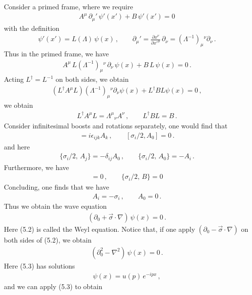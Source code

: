 \documentclass[11pt, onesided]{book}
\theoremstyle{break}
\theoremstyle{break}
\newcommand{\pd}{\partial}
\begin{document}
Consider a primed frame, where we require
\begin{align*}
A^\mu\, \pd_\mu' \, \psi'(x') + B\, \psi'(x') = 0
\end{align*}
with the definition
\begin{align*}
\psi'(x') = L(\Lambda)\, \psi(x)\,, \qquad
\pd_\mu' = \frac{\pd x^\nu}{\pd x'^\mu}\,\pd_\nu = (\Lambda^{-1})_\mu{}^{\nu}\pd_\nu\,.
\end{align*}
Thus in the primed frame, we have
\begin{align*}
A^\mu \, L(\Lambda^{-1})_\mu{}^{\nu}\,\pd_\nu \, \psi(x) + B \, L\,\psi(x) = 0\,.
\end{align*}
Acting $L^\dagger = L^{-1}$ on both sides, we obtain
\begin{align*}
(L^\dagger A^\mu L ) ( \Lambda^{-1})_{\mu}{}^\nu\pd_\nu \psi(x) + L^\dagger BL\psi(x) =0\,,
\end{align*}
we obtain
\begin{align*}
L^\dagger A^\mu L = \Lambda^\mu{}_{\nu}A^\nu \,,\qquad L^\dagger BL = B\,.
\end{align*}
Consider infinitesimal boosts and rotations separately, one would find that
\begin{align*}
[\sigma_i/2,\, A_j] = i\epsilon_{ijk} A_k\,,\qquad [\sigma_i/2, A_0] = 0\,.
\end{align*} 
and here
\begin{align*}
\{\sigma_i/2,\, A_j\}  = -\delta_{ij}A_0\,,\qquad
\{\sigma_i/2,\, A_0\} = -A_i\,.
\end{align*}
Furthermore, we have
\begin{align*}
[\sigma_i/2, B] = 0\,,\qquad \{\sigma_i/2,\,B\} = 0
\end{align*}
Concluding, one finds that we have
\begin{align*}
A_i = -\sigma_i\,,\qquad A_0 = 0\,.
\end{align*}
Thus we obtain the wave equation
\begin{align}
\left(\pd_0 + \vec{\sigma}\cdot \nabla\right) \,\psi(x)  = 0\,.
\end{align}
Here (5.2) is called the Weyl equation. Notice that, if one apply $(\pd_0 - \vec{\sigma}\cdot \nabla)$ on both sides of (5.2), we obtain
\begin{align}
(\pd_0^2 - \nabla^2) \, \psi(x) = 0\,.
\end{align}
Here (5.3) has solutions 
\begin{align*}
\psi(x) = u(p)\, e^{-ipx}\,,
\end{align*}
and we can apply (5.3) to obtain
\end{document}

